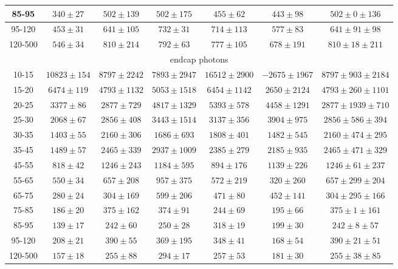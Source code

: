 \begin{table}[h]
\begin{center}
\begin{tabular}{|c|c|c|c|c|c|c|}
    85-95 & $340\pm27$ & $502\pm139$ & $502\pm175$ & $455\pm62$ & $443\pm98$ &$502\pm0\pm136$  \\ \hline
    95-120 & $453\pm31$ & $641\pm105$ & $732\pm31$ & $714\pm113$ & $577\pm83$ &$641\pm91\pm98$  \\ \hline
    120-500 & $546\pm34$ & $810\pm214$ & $792\pm63$ & $777\pm105$ & $678\pm191$ &$810\pm18\pm211$  \\ \hline
    \multicolumn{7}{|c|}{endcap photons} \\ \hline
    10-15 & $10823\pm154$ & $8797\pm2242$ & $7893\pm2947$ & $16512\pm2900$ & $-2675\pm1967$ &$8797\pm903\pm2184$  \\ \hline
    15-20 & $6474\pm119$ & $4793\pm1132$ & $5053\pm1518$ & $6454\pm1142$ & $2650\pm2124$ &$4793\pm260\pm1101$  \\ \hline
    20-25 & $3377\pm86$ & $2877\pm729$ & $4817\pm1329$ & $5393\pm578$ & $4458\pm1291$ &$2877\pm1939\pm710$  \\ \hline
    25-30 & $2068\pm67$ & $2856\pm408$ & $3443\pm1514$ & $3137\pm356$ & $3904\pm975$ &$2856\pm586\pm394$  \\ \hline
    30-35 & $1403\pm55$ & $2160\pm306$ & $1686\pm693$ & $1808\pm401$ & $1482\pm545$ &$2160\pm474\pm295$  \\ \hline
    35-45 & $1489\pm57$ & $2465\pm339$ & $2937\pm1009$ & $2385\pm279$ & $2185\pm935$ &$2465\pm471\pm329$  \\ \hline
    45-55 & $818\pm42$ & $1246\pm243$ & $1184\pm595$ & $894\pm176$ & $1139\pm226$ &$1246\pm61\pm237$  \\ \hline
    55-65 & $550\pm34$ & $657\pm208$ & $957\pm375$ & $572\pm219$ & $320\pm260$ &$657\pm299\pm204$  \\ \hline
    65-75 & $280\pm24$ & $304\pm169$ & $599\pm206$ & $471\pm80$ & $452\pm141$ &$304\pm295\pm166$  \\ \hline
    75-85 & $186\pm20$ & $375\pm162$ & $374\pm91$ & $244\pm69$ & $195\pm66$ &$375\pm1\pm161$  \\ \hline
    85-95 & $139\pm17$ & $242\pm60$ & $250\pm28$ & $318\pm19$ & $199\pm30$ &$242\pm8\pm57$  \\ \hline
    95-120 & $208\pm21$ & $390\pm55$ & $369\pm195$ & $348\pm41$ & $168\pm54$ &$390\pm21\pm51$  \\ \hline
    120-500 & $157\pm18$ & $255\pm88$ & $294\pm17$ & $257\pm53$ & $181\pm30$ &$255\pm38\pm85$  \\ \hline
  \end{tabular}
  \label{tab:diff_ways_to_fit_phoEt_muon}
  \end{center}
\end{table}

